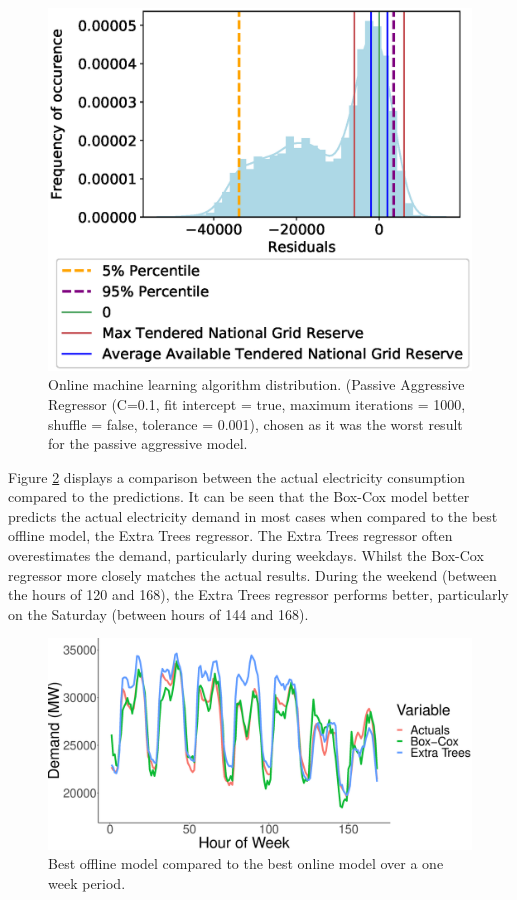 \documentclass[final,3p,times,twocolumn,numbers]{elsarticle}
\begin{document}
\begin{figure}[h]
\centering
\includegraphics[width=\columnwidth,natwidth=500,natheight=400]{figures/results/online_learning_dists-C-0.1-fit_intercept-true-max_iter-1000-shuffle-false-tol 0.001.eps}
\caption{Online machine learning algorithm distribution. (Passive Aggressive Regressor (C=0.1, fit intercept = true, maximum iterations = 1000, shuffle = false, tolerance = 0.001), chosen as it was the worst result for the passive aggressive model.}
\label{fig:bad_online_learning_day_distribution}
\end{figure}


Figure \ref{fig:both_actual_predicted} displays a comparison between the actual electricity consumption compared to the predictions. It can be seen that the Box-Cox model better predicts the actual electricity demand in most cases when compared to the best offline model, the Extra Trees regressor. The Extra Trees regressor often overestimates the demand, particularly during weekdays. Whilst the Box-Cox regressor more closely matches the actual results. During the weekend (between the hours of 120 and 168), the Extra Trees regressor performs better, particularly on the Saturday (between hours of 144 and 168). 


\begin{figure}[h]
\centering
\includegraphics[width=\columnwidth]{figures/results/both_actual_predicted.eps}
\caption{Best offline model compared to the best online model over a one week period.}
\label{fig:both_actual_predicted}
\end{figure}
\end{document}
